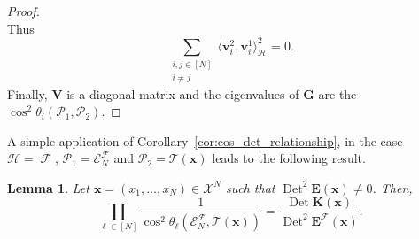 \documentclass[twoside,11pt]{book}
\newtheorem{lemma}{Lemma}
\DeclareMathOperator{\Det}{Det}
\DeclareMathOperator{\F}{\mathcal{F}}
\begin{document}
\begin{proof}
\begin{equation}
\end{equation}
Thus
\begin{equation}
\sum\limits_{\substack{i,j \in [N]\\ i \neq j}} \langle \bm{v}_{i}^{2}, \bm{v}_{i}^{1}\rangle_{\mathcal{H}}^{2} = 0 .
\end{equation}
Finally, $\bm{V}$ is a diagonal matrix and the eigenvalues of $\bm{G}$ are the $\cos^{2} \theta_{i}(\mathcal{P}_{1},\mathcal{P}_{2})$.
\end{proof}

A simple application of Corollary~\ref{cor:cos_det_relationship}, in the case $\mathcal{H} = \F$, $\mathcal{P}_{1} = \mathcal{E}_{N}^{\F}$ and $\mathcal{P}_{2} = \mathcal{T}(\bm{x})$ leads to the following result.

\begin{lemma}\label{lemma:cos_ratio_det}
Let $\bm{x} =  (x_{1}, \dots , x_{N}) \in \mathcal{X}^{N} $ such that $\Det^{2} \bm{E}(\bm{x}) \neq 0$. Then,
\begin{equation}
\prod\limits_{\ell \in [N]} \frac{1}{\cos^{2} \theta_{\ell} \left(\mathcal{E}^{\mathcal{F}}_{N}, \mathcal{T}(\bm{x}) \right)} = \frac{\Det \bm{K}(\bm{x})}{\Det^{2} \bm{E}^{\mathcal{F}}(\bm{x})}.
\end{equation}
\end{lemma}
\end{document}
